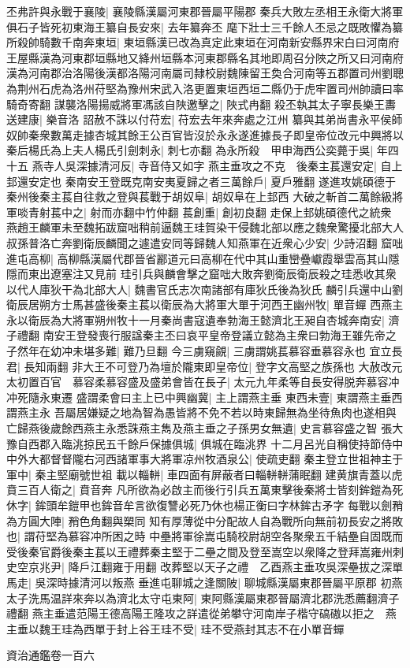 丕弗許與永戰于襄陵|{
	襄陵縣漢屬河東郡晉屬平陽郡}
秦兵大敗左丞相王永衛大將軍俱石子皆死初東海王纂自長安來|{
	去年纂奔丕}
麾下壯士三千餘人丕忌之既敗懼為纂所殺帥騎數千南奔東垣|{
	東垣縣漢已改為真定此東垣在河南新安縣界宋白曰河南府王屋縣漢為河東郡垣縣地又絳州垣縣本河東郡縣名其地即周召分陜之所又曰河南府漢為河南郡治洛陽後漢都洛陽河南屬司隸校尉魏陳留王奐合河南等五郡置司州劉聰為荆州石虎為洛州苻堅為豫州宋武入洛更置東垣西垣二縣仍于虎牢置司州帥讀曰率騎奇寄翻}
謀襲洛陽揚威將軍馮該自陜邀擊之|{
	陜式冉翻}
殺丕執其太子寧長樂王夀送建康|{
	樂音洛}
詔赦不誅以付苻宏|{
	苻宏去年來奔處之江州}
纂與其弟尚書永平侯師奴帥秦衆數萬走據杏城其餘王公百官皆沒於永永遂進據長子即皇帝位改元中興將以秦后楊氏為上夫人楊氏引劍刺永|{
	刺七亦翻}
為永所殺　甲申海西公奕薨于吳|{
	年四十五}
燕寺人吳深據清河反|{
	寺音侍又如字}
燕主垂攻之不克　後秦主萇還安定|{
	自上邽還安定也}
秦南安王登既克南安夷夏歸之者三萬餘戶|{
	夏戶雅翻}
遂進攻姚碩德于秦州後秦主萇自往救之登與萇戰于胡奴阜|{
	胡奴阜在上邽西}
大破之斬首二萬餘級將軍啖青射萇中之|{
	射而亦翻中竹仲翻}
萇創重|{
	創初良翻}
走保上邽姚碩德代之統衆　燕趙王麟軍未至魏拓跋窟咄稍前逼魏王珪賀染干侵魏北部以應之魏衆驚擾北部大人叔孫普洛亡奔劉衛辰麟聞之遽遣安同等歸魏人知燕軍在近衆心少安|{
	少詩沼翻}
窟咄進屯高柳|{
	高柳縣漢屬代郡晉省酈道元曰高柳在代中其山重巒疊巘霞舉雲高其山隱隱而東出遼塞注又見前}
珪引兵與麟會擊之窟咄大敗奔劉衛辰衛辰殺之珪悉收其衆以代人庫狄干為北部大人|{
	魏書官氏志次南諸部有庫狄氏後為狄氏}
麟引兵還中山劉衛辰居朔方士馬甚盛後秦主萇以衛辰為大將軍大單于河西王幽州牧|{
	單音蟬}
西燕主永以衛辰為大將軍朔州牧十一月秦尚書寇遺奉勃海王懿濟北王昶自杏城奔南安|{
	濟子禮翻}
南安王登發喪行服諡秦主丕曰哀平皇帝登議立懿為主衆曰勃海王雖先帝之子然年在幼冲未堪多難|{
	難乃旦翻}
今三虜窺覦|{
	三虜謂姚萇慕容垂慕容永也}
宜立長君|{
	長知兩翻}
非大王不可登乃為壇於隴東即皇帝位|{
	登字文高堅之族孫也}
大赦改元太初置百官　慕容柔慕容盛及盛弟會皆在長子|{
	太元九年柔等自長安得脱奔慕容冲冲死隨永東遷}
盛謂柔會曰主上已中興幽冀|{
	主上謂燕主垂}
東西未壹|{
	東謂燕主垂西謂燕主永}
吾屬居嫌疑之地為智為愚皆將不免不若以時東歸無為坐待魚肉也遂相與亡歸燕後歲餘西燕主永悉誅燕主雋及燕主垂之子孫男女無遺|{
	史言慕容盛之智}
張大豫自西郡入臨洮掠民五千餘戶保據俱城|{
	俱城在臨洮界}
十二月呂光自稱使持節侍中中外大都督督隴右河西諸軍事大將軍凉州牧酒泉公|{
	使疏吏翻}
秦主登立世祖神主于軍中|{
	秦主堅廟號世祖}
載以輜軿|{
	車四面有屏蔽者曰輜軿軿蒲眠翻}
建黄旗青蓋以虎賁三百人衛之|{
	賁音奔}
凡所欲為必啟主而後行引兵五萬東擊後秦將士皆刻鉾鎧為死休字|{
	鉾頭牟鎧甲也鉾音牟言欲復讐必死乃休也楊正衡曰字林鉾古矛字}
每戰以劍矟為方圓大陣|{
	矟色角翻與槊同}
知有厚薄從中分配故人自為戰所向無前初長安之將敗也|{
	謂苻堅為慕容冲所困之時}
中壘將軍徐嵩屯騎校尉胡空各聚衆五千結壘自固既而受後秦官爵後秦主萇以王禮葬秦主堅于二壘之間及登至嵩空以衆降之登拜嵩雍州刺史空京兆尹|{
	降戶江翻雍于用翻}
改葬堅以天子之禮　乙酉燕主垂攻吳深壘拔之深單馬走|{
	吳深時據清河以叛燕}
垂進屯聊城之逢關陂|{
	聊城縣漢屬東郡晉屬平原郡}
初燕太子洗馬温詳來奔以為濟北太守屯東阿|{
	東阿縣漢屬東郡晉屬濟北郡洗悉薦翻濟子禮翻}
燕主垂遣范陽王德高陽王隆攻之詳遣從弟攀守河南岸子楷守碻磝以拒之　燕主垂以魏王珪為西單于封上谷王珪不受|{
	珪不受燕封其志不在小單音蟬}


資治通鑑卷一百六
